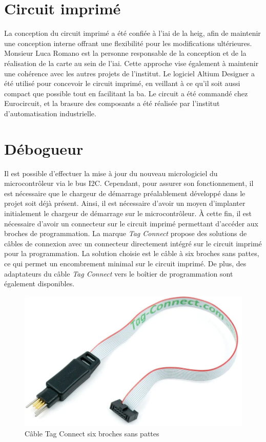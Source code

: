 \section{Circuit imprimé}

La conception du circuit imprimé a été confiée à l'\gls{iai} de la \gls{heig}, afin de maintenir une conception interne offrant une flexibilité pour les modifications ultérieures.
Monsieur Luca Romano est la personne responsable de la conception et de la réalisation de la carte au sein de l'\gls{iai}. Cette approche vise également à maintenir une cohérence avec les autres projets de l'institut.
Le logiciel Altium Designer a été utilisé pour concevoir le circuit imprimé, en veillant à ce qu'il soit aussi compact que possible tout en facilitant la ba.
Le circuit a été commandé chez Eurocircuit, et la brasure des composants a été réalisée par l'institut d'automatisation industrielle.

\section{Débogueur}

Il est possible d'effectuer la mise à jour du nouveau micrologiciel du microcontrôleur via le bus I2C.
Cependant, pour assurer son fonctionnement, il est nécessaire que le chargeur de démarrage préalablement développé dans le projet soit déjà présent.
Ainsi, il est nécessaire d'avoir un moyen d'implanter initialement le chargeur de démarrage sur le microcontrôleur.
À cette fin, il est nécessaire d'avoir un connecteur sur le circuit imprimé permettant d'accéder aux broches de programmation.
La marque \textit{Tag Connect} propose des solutions de câbles de connexion avec un connecteur directement intégré sur le circuit imprimé pour la programmation.
La solution choisie est le câble à six broches sans pattes, ce qui permet un encombrement minimal sur le circuit imprimé.
De plus, des adaptateurs du câble \textit{Tag Connect} vers le boîtier de programmation sont également disponibles.

\begin{figure}[H]
    \centering
    \includegraphics[scale=0.2]{./assets/figures/tag_connect.png}
    \caption{\cite{tag_connect} Câble Tag Connect six broches sans pattes}
\end{figure}

